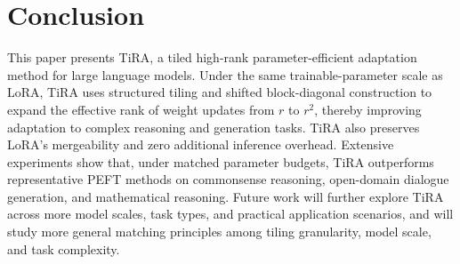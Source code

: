 \documentclass[a4paper,11pt]{article}
\begin{document}
\section{Conclusion}

This paper presents TiRA, a tiled high-rank parameter-efficient adaptation method for large language models. Under the same trainable-parameter scale as LoRA, TiRA uses structured tiling and shifted block-diagonal construction to expand the effective rank of weight updates from $r$ to $r^2$, thereby improving adaptation to complex reasoning and generation tasks. TiRA also preserves LoRA's mergeability and zero additional inference overhead. Extensive experiments show that, under matched parameter budgets, TiRA outperforms representative PEFT methods on commonsense reasoning, open-domain dialogue generation, and mathematical reasoning. Future work will further explore TiRA across more model scales, task types, and practical application scenarios, and will study more general matching principles among tiling granularity, model scale, and task complexity.
\end{document}
